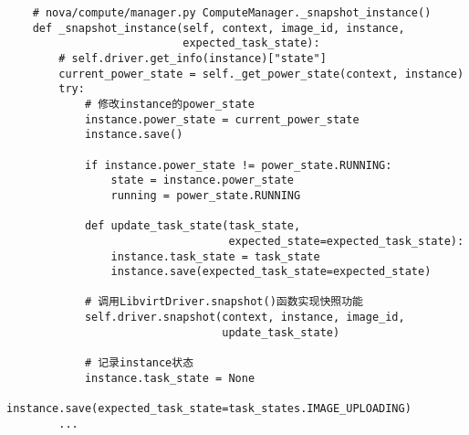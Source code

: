 \documentclass[a4paper,left=1.5cm,right=1.5cm,11pt]{article}
\begin{document}
    \begin{lstlisting}
    # nova/compute/manager.py ComputeManager._snapshot_instance()
    def _snapshot_instance(self, context, image_id, instance,
                           expected_task_state):
        # self.driver.get_info(instance)["state"]
        current_power_state = self._get_power_state(context, instance)
        try:
            # 修改instance的power_state
            instance.power_state = current_power_state
            instance.save()

            if instance.power_state != power_state.RUNNING:
                state = instance.power_state
                running = power_state.RUNNING

            def update_task_state(task_state,
                                  expected_state=expected_task_state):
                instance.task_state = task_state
                instance.save(expected_task_state=expected_state)

            # 调用LibvirtDriver.snapshot()函数实现快照功能
            self.driver.snapshot(context, instance, image_id,
                                 update_task_state)
            
            # 记录instance状态
            instance.task_state = None
            instance.save(expected_task_state=task_states.IMAGE_UPLOADING)
        ...
    \end{lstlisting}
\end{document}
